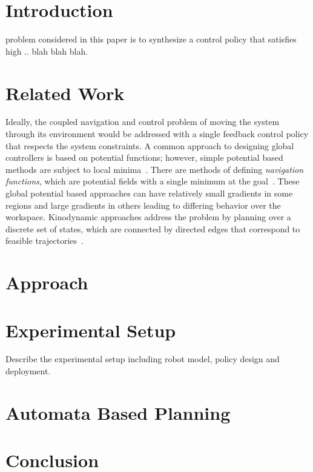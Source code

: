 \documentclass[journal,twoside]{IEEEtran}
\begin{document}
\section{Introduction}
 problem considered in this paper is to synthesize
a control policy that satisfies high .. blah blah blah.


\section{Related Work}

Ideally, the coupled navigation and control problem of moving the
system through its environment would be addressed with a single
feedback control policy that respects the system constraints.  A
common approach to designing global controllers is based on potential
functions; however, simple potential based methods are subject to
local minima~\cite{kod_87}.  There are methods of defining
\emph{navigation functions}, which are potential fields with a single
minimum at the goal~\cite{rim_kod_92,con_grup_93}.  These global
potential based approaches can have relatively small gradients in some
regions and large gradients in others leading to differing behavior
over the workspace.  Kinodynamic approaches address the problem by
planning over a discrete set of states, which are connected by directed edges
that correspond to feasible trajectories~\cite{donald_93}.

\section{Approach}
\label{sec:approach}



\section{Experimental Setup}
\label{sec:setup}

{\large  Describe the experimental setup including robot model, policy design and deployment.}



\section{Automata Based Planning}
\label{sec:planning_detailed}



\section{Conclusion}
\label{sec:concl}
 
\end{document}
